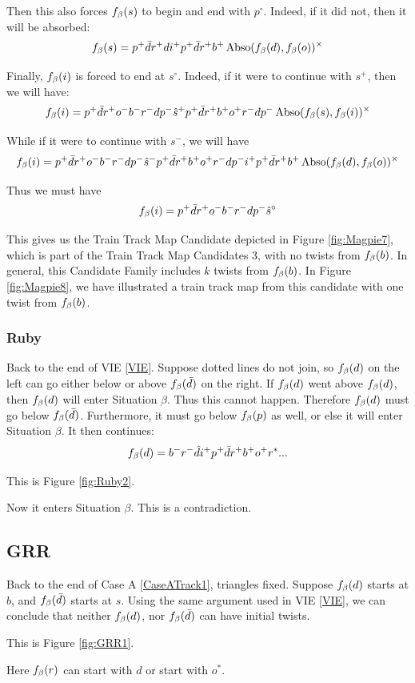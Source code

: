 Then this also forces $f_\beta(s)$ to begin and end with $p^\circ$. Indeed, if it did not, then it will be absorbed:
\[
f_\beta(s) = p^+ \bar{d} r^+ d i^+ p^+ \bar{d} r^+ b^+ \operatorname{Abso}(f_\beta(d), f_\beta(o))^\times
\]

Finally, $f_\beta(i)$ is forced to end at $s^\circ$. Indeed, if it were to continue with $s^+$, then we will have:
\[
f_\beta(i) = p^+ \bar{d} r^+ o^- b^- r^- d p^- \hat{s}^+ p^+ \bar{d} r^+ b^+ o^+ r^- d p^- \operatorname{Abso}(f_\beta(s), f_\beta(i))^\times
\]

While if it were to continue with $s^-$, we will have
\[
f_\beta(i) = p^+ \bar{d} r^+ o^- b^- r^- d p^- \hat{s}^- p^+ \bar{d} r^+ b^+ o^+ r^- d p^- i^+ p^+ \bar{d} r^+ b^+ \operatorname{Abso}(f_\beta(d), f_\beta(o))^\times
\]

Thus we must have 
\[
f_\beta(i) = p^+ \bar{d} r^+ o^- b^- r^- d p^- \hat{s}^\circ
\]

This gives us the Train Track Map Candidate depicted in Figure \ref{fig:Magpie7}, which is part of the Train Track Map Candidates 3, with no twists from $f_\beta(b)$. In general, this Candidate Family includes $k$ twists from $f_\beta(b)$. In Figure \ref{fig:Magpie8}, we have illustrated a train track map from this candidate with one twist from $f_\beta(b)$.


\subsubsection{Ruby}\label{Ruby} 
Back to the end of VIE \ref{VIE}. Suppose dotted lines do not join, so $f_\beta(d)$ on the left can go either below or above $f_\beta(\bar{d})$ on the right. If $f_\beta(d)$ went above $f_\beta(d)$, then $f_\beta(d)$ will enter Situation $\beta$. Thus this cannot happen. Therefore $f_\beta(d)$ must go below $f_\beta(\bar{d})$. Furthermore, it must go below $f_\beta(p)$ as well, or else it will enter Situation $\beta$. It then continues:
\[
f_\beta(d) = b^- r^- \hat{d} i^+ p^+ \bar{d} r^+ b^+ o^+ r^*...
\]

This is Figure \ref{fig:Ruby2}.

Now it enters Situation $\beta$. This is a contradiction.

\subsection{GRR} \label{GRR}
Back to the end of Case A \ref{CaseATrack1}, triangles fixed. Suppose $f_\beta(d)$ starts at $b$, and $f_\beta(\bar{d})$ starts at $s$. Using the same argument used in VIE \ref{VIE}, we can conclude that neither $f_\beta(d)$, nor $f_\beta(\bar{d})$ can have initial twists.

This is Figure \ref{fig:GRR1}.

Here $f_\beta(r)$ can start with $d$ or start with $o^*$. 

